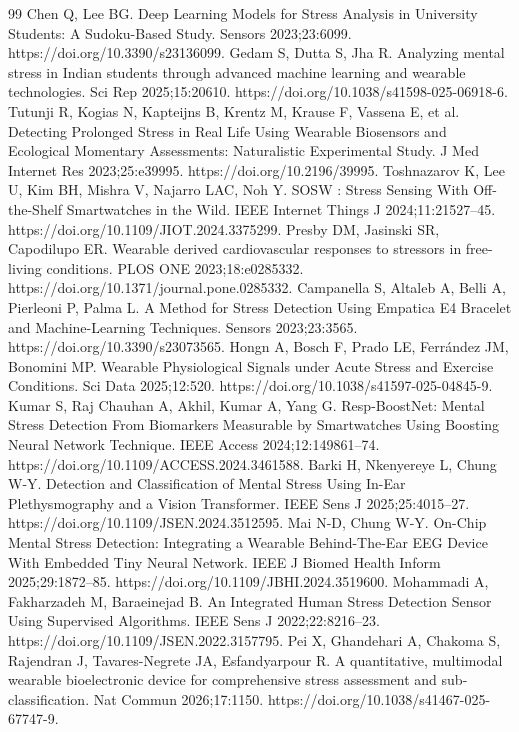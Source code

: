\documentclass[11pt,a4paper]{article}
\begin{document}
\begin{thebibliography}{99}
 Chen Q, Lee BG. Deep Learning Models for Stress Analysis in University Students: A Sudoku-Based Study. Sensors 2023;23:6099. https://doi.org/10.3390/s23136099.
 Gedam S, Dutta S, Jha R. Analyzing mental stress in Indian students through advanced machine learning and wearable technologies. Sci Rep 2025;15:20610. https://doi.org/10.1038/s41598-025-06918-6.
 Tutunji R, Kogias N, Kapteijns B, Krentz M, Krause F, Vassena E, et al. Detecting Prolonged Stress in Real Life Using Wearable Biosensors and Ecological Momentary Assessments: Naturalistic Experimental Study. J Med Internet Res 2023;25:e39995. https://doi.org/10.2196/39995.
 Toshnazarov K, Lee U, Kim BH, Mishra V, Najarro LAC, Noh Y. SOSW : Stress Sensing With Off-the-Shelf Smartwatches in the Wild. IEEE Internet Things J 2024;11:21527--45. https://doi.org/10.1109/JIOT.2024.3375299.
 Presby DM, Jasinski SR, Capodilupo ER. Wearable derived cardiovascular responses to stressors in free-living conditions. PLOS ONE 2023;18:e0285332. https://doi.org/10.1371/journal.pone.0285332.
 Campanella S, Altaleb A, Belli A, Pierleoni P, Palma L. A Method for Stress Detection Using Empatica E4 Bracelet and Machine-Learning Techniques. Sensors 2023;23:3565. https://doi.org/10.3390/s23073565.
 Hongn A, Bosch F, Prado LE, Ferrández JM, Bonomini MP. Wearable Physiological Signals under Acute Stress and Exercise Conditions. Sci Data 2025;12:520. https://doi.org/10.1038/s41597-025-04845-9.
 Kumar S, Raj Chauhan A, Akhil, Kumar A, Yang G. Resp-BoostNet: Mental Stress Detection From Biomarkers Measurable by Smartwatches Using Boosting Neural Network Technique. IEEE Access 2024;12:149861--74. https://doi.org/10.1109/ACCESS.2024.3461588.
 Barki H, Nkenyereye L, Chung W-Y. Detection and Classification of Mental Stress Using In-Ear Plethysmography and a Vision Transformer. IEEE Sens J 2025;25:4015--27. https://doi.org/10.1109/JSEN.2024.3512595.
 Mai N-D, Chung W-Y. On-Chip Mental Stress Detection: Integrating a Wearable Behind-The-Ear EEG Device With Embedded Tiny Neural Network. IEEE J Biomed Health Inform 2025;29:1872--85. https://doi.org/10.1109/JBHI.2024.3519600.
 Mohammadi A, Fakharzadeh M, Baraeinejad B. An Integrated Human Stress Detection Sensor Using Supervised Algorithms. IEEE Sens J 2022;22:8216--23. https://doi.org/10.1109/JSEN.2022.3157795.
 Pei X, Ghandehari A, Chakoma S, Rajendran J, Tavares-Negrete JA, Esfandyarpour R. A quantitative, multimodal wearable bioelectronic device for comprehensive stress assessment and sub-classification. Nat Commun 2026;17:1150. https://doi.org/10.1038/s41467-025-67747-9.

\end{thebibliography}
\end{document}
